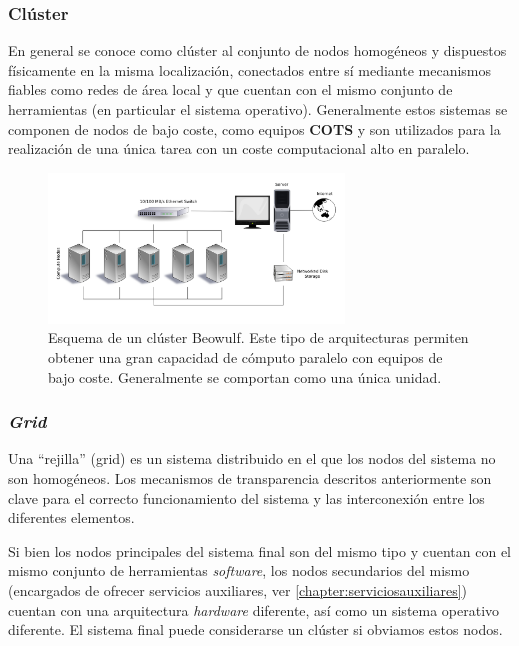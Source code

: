 \subsubsection{Clúster}

En general se conoce como clúster al conjunto de nodos homogéneos y dispuestos físicamente en la misma localización, conectados entre sí mediante mecanismos fiables como redes de área local y que cuentan con el mismo conjunto de herramientas (en particular el sistema operativo). Generalmente estos sistemas se componen de nodos de bajo coste, como equipos \textbf{COTS} y son utilizados para la realización de una única tarea con un coste computacional alto en paralelo.

\begin{figure}[H]
  \centering
  \includegraphics[width=0.7\textwidth]{Chapter2/Figures/Beowulf.png}
  \caption[Esquema de un clúster Beowulf]{Esquema de un clúster Beowulf. Este tipo de arquitecturas permiten obtener una gran capacidad de cómputo paralelo con equipos de bajo coste. Generalmente se comportan como una única unidad.}
\label{fig:beowulf}
\end{figure}

\subsubsection{\textit{Grid}}

Una ``rejilla'' (grid) es un sistema distribuido en el que los nodos del sistema no son homogéneos. Los mecanismos de transparencia descritos anteriormente son clave para el correcto funcionamiento del sistema y las interconexión entre los diferentes elementos.


Si bien los nodos principales del sistema final son del mismo tipo y cuentan con el mismo conjunto de herramientas \textit{software}, los nodos secundarios del mismo (encargados de ofrecer servicios auxiliares, ver \ref{chapter:serviciosauxiliares}) cuentan con una arquitectura \textit{hardware} diferente, así como un sistema operativo diferente. El sistema final puede considerarse un clúster si obviamos estos nodos.

